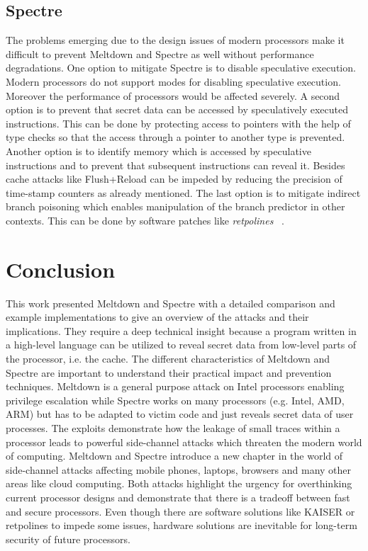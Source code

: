 \documentclass[a4paper,oneside,openright] {scrreprt}
\begin{document}
\section{Spectre}
\label{ch:intro:motivation}

The problems emerging due to the design issues of modern processors make it difficult to prevent Meltdown and Spectre 
as well without performance degradations.
One option to mitigate Spectre is to disable speculative execution. 
Modern processors do not support modes for disabling speculative execution. 
Moreover the performance of processors would be affected severely.
A second option is to prevent that secret data can be accessed by speculatively executed instructions. 
This can be done by protecting access to pointers with the help of type checks 
so that the access through a pointer to another type is prevented.
Another option is to identify memory which is accessed by speculative instructions and to prevent that subsequent
instructions can reveal it.
Besides cache attacks like Flush+Reload can be impeded by reducing the precision of time-stamp counters as already mentioned.
The last option is to mitigate indirect branch poisoning which enables manipulation of the branch predictor in other contexts.
This can be done by software patches like \textit{retpolines} ~\cite{retpoline}.
\chapter{Conclusion}
\label{ch:conclusion}

This work presented Meltdown and Spectre with a detailed comparison and example implementations to give 
an overview of the attacks and their implications.
They require a deep technical insight because a program written in a high-level language can be utilized 
to reveal secret data from low-level parts of the processor, i.e. the cache.
The different characteristics of Meltdown and Spectre are important to understand their practical impact
and prevention techniques.
Meltdown is a general purpose attack on Intel processors enabling privilege escalation while Spectre 
works on many processors (e.g. Intel, AMD, ARM) but has to be adapted to victim code and just reveals secret data of user processes.
The exploits demonstrate how the leakage of small traces within a processor leads to powerful side-channel attacks
which threaten the modern world of computing. 
Meltdown and Spectre introduce a new chapter in the world of side-channel attacks affecting mobile phones, laptops, browsers and 
many other areas like cloud computing.
Both attacks highlight the urgency for overthinking current processor designs and demonstrate that there is a tradeoff between
fast and secure processors.
Even though there are software solutions like KAISER or retpolines to impede some issues, 
hardware solutions are inevitable for long-term security of future processors.

\lstlistoflistings



\end{document}
